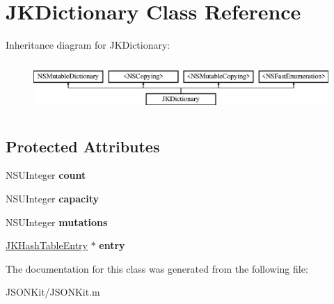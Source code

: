 \hypertarget{interface_j_k_dictionary}{\section{J\+K\+Dictionary Class Reference}
\label{interface_j_k_dictionary}
}
Inheritance diagram for J\+K\+Dictionary\+:\begin{figure}[H]
\begin{center}
\leavevmode
\includegraphics[height=1.931034cm]{interface_j_k_dictionary}
\end{center}
\end{figure}
\subsection*{Protected Attributes}
\begin{DoxyCompactItemize}
\item 
\hypertarget{interface_j_k_dictionary_af9a788a17e658c6f1b66a24fd9b1b42a}{N\+S\+U\+Integer {\bfseries count}}\label{interface_j_k_dictionary_af9a788a17e658c6f1b66a24fd9b1b42a}

\item 
\hypertarget{interface_j_k_dictionary_a0573bbe8650a3d8b075b8f06fd9fe3c6}{N\+S\+U\+Integer {\bfseries capacity}}\label{interface_j_k_dictionary_a0573bbe8650a3d8b075b8f06fd9fe3c6}

\item 
\hypertarget{interface_j_k_dictionary_ac7f772c0ef0a376a4fe48aca3496ccb3}{N\+S\+U\+Integer {\bfseries mutations}}\label{interface_j_k_dictionary_ac7f772c0ef0a376a4fe48aca3496ccb3}

\item 
\hypertarget{interface_j_k_dictionary_ad329317a4a2c0076e67efc69cfc45830}{\hyperlink{struct_j_k_hash_table_entry}{J\+K\+Hash\+Table\+Entry} $\ast$ {\bfseries entry}}\label{interface_j_k_dictionary_ad329317a4a2c0076e67efc69cfc45830}

\end{DoxyCompactItemize}


The documentation for this class was generated from the following file\+:\begin{DoxyCompactItemize}
\item 
J\+S\+O\+N\+Kit/J\+S\+O\+N\+Kit.\+m\end{DoxyCompactItemize}

